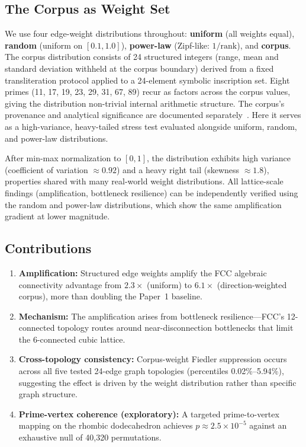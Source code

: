 \documentclass[11pt]{article}
\begin{document}
\subsection{The Corpus as Weight Set}
\label{sec:corpus}

We use four edge-weight distributions throughout: \textbf{uniform}
(all weights equal), \textbf{random} (uniform on $[0.1, 1.0]$),
\textbf{power-law} (Zipf-like: $1/\text{rank}$), and
\textbf{corpus}. The corpus distribution consists of 24 structured
integers (range, mean and standard deviation withheld at the corpus boundary) derived from a fixed transliteration protocol applied to a 24-element
symbolic inscription set. Eight primes (11, 17, 19, 23, 29, 31, 67, 89)
recur as factors across the corpus values, giving the distribution
non-trivial internal arithmetic structure. The corpus's provenance
and analytical significance are documented
separately~\cite{bielec2026shape}. Here it serves as a high-variance,
heavy-tailed stress test evaluated alongside uniform, random, and
power-law distributions.

After min-max normalization to $[0,1]$, the distribution exhibits
high variance (coefficient of variation $\approx 0.92$) and a heavy
right tail (skewness $\approx 1.8$), properties shared with many
real-world weight distributions. All lattice-scale findings
(amplification, bottleneck resilience) can be independently verified
using the random and power-law distributions, which show the same
amplification gradient at lower magnitude.

\subsection{Contributions}

\begin{enumerate}
  \item \textbf{Amplification:} Structured edge weights amplify the
    FCC algebraic connectivity advantage from $2.3\times$ (uniform)
    to $6.1\times$ (direction-weighted corpus), more than doubling the
    Paper~1 baseline.
  \item \textbf{Mechanism:} The amplification arises from bottleneck
    resilience---FCC's 12-connected topology routes around
    near-disconnection bottlenecks that limit the 6-connected
    cubic lattice.
  \item \textbf{Cross-topology consistency:} Corpus-weight Fiedler
    suppression occurs across all five tested 24-edge graph topologies
    (percentiles 0.02\%--5.94\%), suggesting the effect is driven
    by the weight distribution rather than specific graph structure.
  \item \textbf{Prime-vertex coherence (exploratory):} A targeted prime-to-vertex
    mapping on the rhombic dodecahedron achieves $p \approx 2.5 \times 10^{-5}$
    against an exhaustive null of 40{,}320 permutations.
\end{enumerate}
\end{document}
